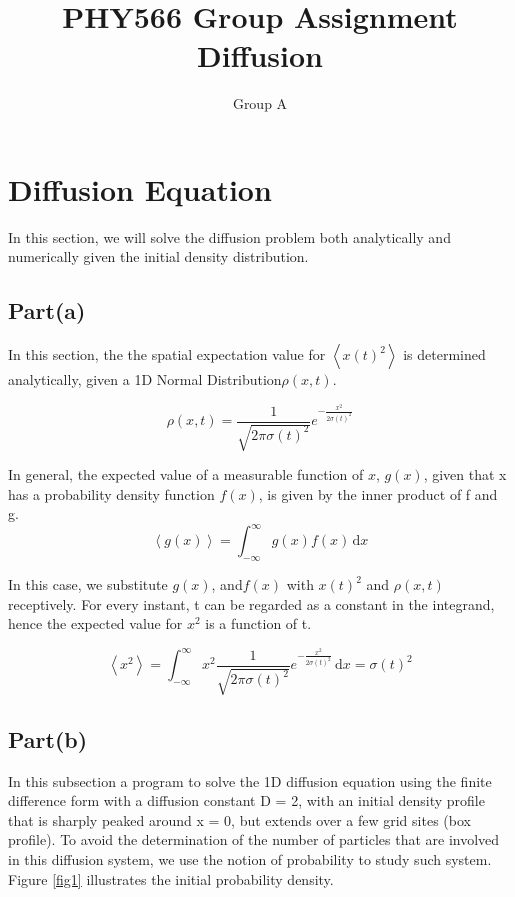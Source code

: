 \documentclass[11pt, oneside]{article}   	%
\title{PHY566 Group Assignment \\ Diffusion}
\author{Group A}
\begin{document}
\maketitle
\section{Diffusion Equation}
In this section, we will solve the diffusion problem both analytically and numerically given the initial density distribution.
\subsection{Part(a)}
In this section, the the spatial expectation value for $\left \langle x(t)^2 \right\rangle$ is determined analytically, given a 1D Normal Distribution$\rho(x,t)$.

\begin{equation*}
\rho(x,t)=\frac{1}{\sqrt{2\pi \sigma(t)^2}}e^{-\frac{x^2}{2\sigma(t)^2}}
\end{equation*}

In general, the expected value of a measurable function of $x$, $g(x)$, given that x has a probability density function $f(x)$, is given by the inner product of f and g.
\begin{equation*}
\left \langle g(x) \right\rangle= \int_{-\infty}^{\infty} g(x)f(x)\, \mathrm{d}x
\end{equation*}

In this case, we substitute $g(x)$, and$f(x)$ with $x(t)^2$ and $\rho(x,t)$ receptively. For every instant, t can be regarded as a constant in the integrand, hence the expected value for $x^2$ is a function of t.

\begin{equation*}
\left \langle x^2 \right\rangle= \int_{-\infty}^{\infty} x^2\frac{1}{\sqrt{2\pi \sigma(t)^2}}e^{-\frac{x^2}{2\sigma(t)^2}}\, \mathrm{d}x=\sigma(t)^2
\end{equation*}

\subsection{Part(b)}
In this subsection a program to solve the 1D diffusion equation using the finite difference form with a diffusion constant D = 2, with an initial density profile that is sharply peaked around x = 0, but extends over a few grid sites (box profile). To avoid the determination of the number of  particles  that are involved in this diffusion system, we use the notion of probability to study such system. Figure \ref{fig1} illustrates the initial probability density.
\end{document}
